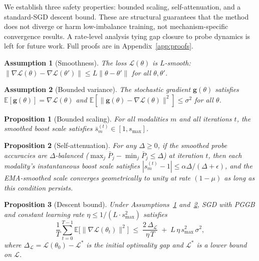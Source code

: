 \documentclass{article}
\newtheorem{assumption}{Assumption}
\newtheorem{proposition}{Proposition}
\newcommand{\loss}{\mathcal{L}}
\begin{document}
We establish three safety properties: bounded scaling, self-attenuation, and a standard-SGD descent bound. These are structural guarantees that the method does not diverge or harm low-imbalance training, not mechanism-specific convergence results. A rate-level analysis tying gap closure to probe dynamics is left for future work. Full proofs are in Appendix~\ref{app:proofs}.

\begin{assumption}[Smoothness]
\label{asm:smooth}
The loss $\loss(\theta)$ is $L$-smooth: $\|\nabla \loss(\theta) - \nabla \loss(\theta')\| \leq L\|\theta - \theta'\|$ for all $\theta, \theta'$.
\end{assumption}

\begin{assumption}[Bounded variance]
\label{asm:variance}
The stochastic gradient $\mathbf{g}(\theta)$ satisfies $\mathbb{E}[\mathbf{g}(\theta)] = \nabla \loss(\theta)$ and $\mathbb{E}[\|\mathbf{g}(\theta) - \nabla \loss(\theta)\|^2] \leq \sigma^2$ for all $\theta$.
\end{assumption}

\begin{proposition}[Bounded scaling]
\label{prop:bounded}
For all modalities $m$ and all iterations $t$, the smoothed boost scale satisfies $\bar{s}_m^{(t)} \in [1, s_{\max}]$.
\end{proposition}

\begin{proposition}[Self-attenuation]
\label{prop:attenuation}
For any $\Delta \geq 0$, if the smoothed probe accuracies are $\Delta$-balanced ($\max_j \bar{P}_j - \min_j \bar{P}_j \leq \Delta$) at iteration $t$, then each modality's instantaneous boost scale satisfies $|s_m^{(t)} - 1| \leq \alpha \Delta / (\Delta + \epsilon)$, and the EMA-smoothed scale converges geometrically to unity at rate $(1-\mu)$ as long as this condition persists.
\end{proposition}

\begin{proposition}[Descent bound]
\label{prop:convergence}
Under Assumptions~\ref{asm:smooth} and~\ref{asm:variance}, SGD with PGGB and constant learning rate $\eta \leq 1/(L \cdot s_{\max}^2)$ satisfies
%
\begin{equation}
\label{eq:convergence}
\frac{1}{T}\sum_{t=0}^{T-1} \mathbb{E}\bigl[\|\nabla \loss(\theta_t)\|^2\bigr]
\;\leq\; \frac{2\,\Delta_{\loss}}{\eta\, T} \;+\; L\,\eta\, s_{\max}^2\, \sigma^2,
\end{equation}
%
where $\Delta_{\loss} = \loss(\theta_0) - \loss^{*}$ is the initial optimality gap and $\loss^{*}$ is a lower bound on $\loss$.
\end{proposition}
\end{document}
